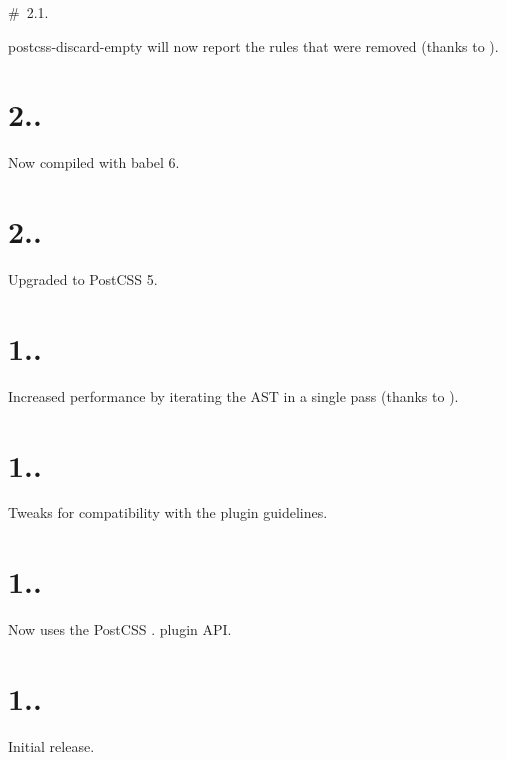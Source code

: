 \# 2.1.


\begin{DoxyItemize}
\item postcss-\/discard-\/empty will now report the rules that were removed (thanks to ).
\end{DoxyItemize}

\section*{2..}


\begin{DoxyItemize}
\item Now compiled with babel 6.
\end{DoxyItemize}

\section*{2..}


\begin{DoxyItemize}
\item Upgraded to Post\+C\+SS 5.
\end{DoxyItemize}

\section*{1..}


\begin{DoxyItemize}
\item Increased performance by iterating the A\+ST in a single pass (thanks to ).
\end{DoxyItemize}

\section*{1..}


\begin{DoxyItemize}
\item Tweaks for compatibility with the plugin guidelines.
\end{DoxyItemize}

\section*{1..}


\begin{DoxyItemize}
\item Now uses the Post\+C\+SS {.} plugin A\+PI.
\end{DoxyItemize}

\section*{1..}


\begin{DoxyItemize}
\item Initial release. 
\end{DoxyItemize}